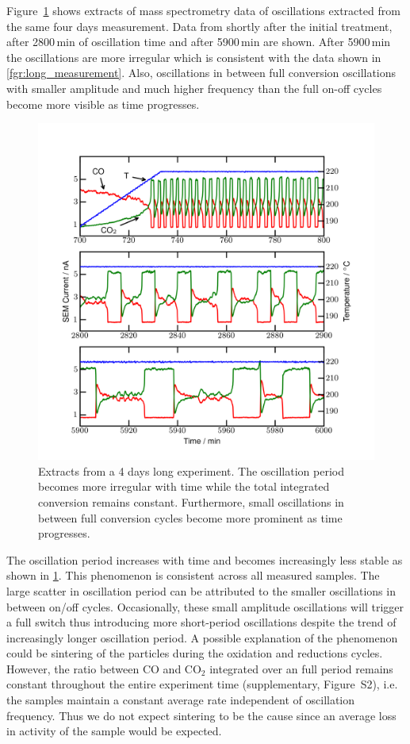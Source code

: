 \documentclass[journal=jacsat,manuscript=article]{achemso}
\begin{document}
Figure~\ref{fgr:extracts} shows extracts of mass spectrometry data of oscillations
extracted from the same four days measurement. Data from shortly after the
initial treatment, after 2800\,min of oscillation time and after 5900\,min are
shown. After 5900\,min the oscillations are more irregular which is consistent
with the data shown in \ref{fgr:long_measurement}. Also, oscillations in
between full conversion oscillations with smaller amplitude and much higher
frequency than the full on-off cycles become more visible as time progresses.
\begin{figure}
  \includegraphics[width=12cm]{extracts_from_very_long_oscillation.png}
  \caption{Extracts from a 4 days long experiment. The oscillation period
  becomes more irregular with time while the total integrated conversion
  remains constant. Furthermore, small oscillations in between full conversion
  cycles become more prominent as time progresses.} \label{fgr:extracts}
\end{figure}

The oscillation period increases with time and becomes increasingly less stable
as shown in \ref{fgr:extracts}. This phenomenon is consistent across all
measured samples. The large scatter in oscillation period can be attributed to
the smaller oscillations in between on/off cycles. Occasionally, these small
amplitude oscillations will trigger a full switch thus introducing more
short-period oscillations despite the trend of increasingly longer oscillation
period. A possible explanation of the phenomenon could be sintering of the
particles during the oxidation and reductions cycles. However, the ratio
between CO and CO$_2$ integrated over an full period remains constant
throughout the entire experiment time (supplementary, Figure~S2), i.e. the samples maintain a constant
average rate independent of oscillation frequency. Thus we do not expect
sintering to be the cause since an average loss in activity of the sample would
be expected.
\end{document}
